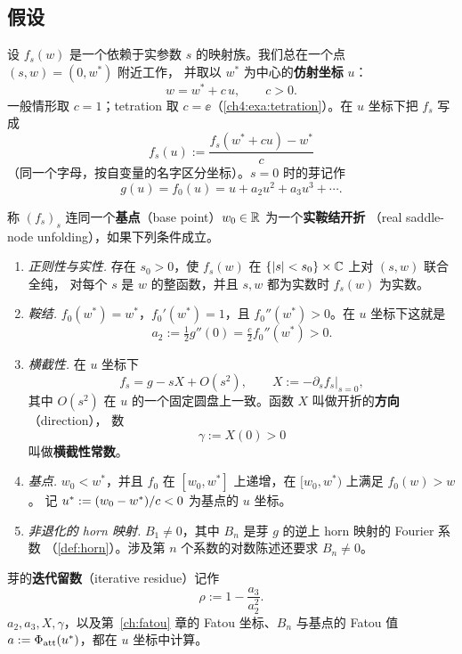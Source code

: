 \subsection{假设}

设 $f_s(w)$ 是一个依赖于实参数 $s$ 的映射族。我们总在一个点 $(s,w)=(0,w^*)$ 附近工作，
并取以 $w^*$ 为中心的\textbf{仿射坐标} $u$：
\begin{equation}\label{ch4:eq:affine}
 w=w^*+c\,u,\qquad c>0 .
\end{equation}
一般情形取 $c=1$；tetration 取 $c=\ee$（\cref{ch4:exa:tetration}）。在 $u$ 坐标下把 $f_s$ 写成
\[
 f_s(u):=\frac{f_s(w^*+cu)-w^*}{c}
\]
（同一个字母，按自变量的名字区分坐标）。$s=0$ 时的芽记作
\[
 g(u)=f_0(u)=u+a_2u^2+a_3u^3+\cdots .
\]

\begin{definition}[实鞍结开折]\label{def:unfolding}
称 $(f_s)_s$ 连同一个\textbf{基点}（base point）$w_0\in\mathbb{R}$ 为一个\textbf{实鞍结开折}
（real saddle-node unfolding），如果下列条件成立。
\begin{enumerate}[label=\textup{(H\arabic*)},leftmargin=3.2em]
\item \emph{正则性与实性.} 存在 $s_0>0$，使 $f_s(w)$ 在 $\{|s|<s_0\}\times\mathbb{C}$ 上对 $(s,w)$ 联合全纯，
  对每个 $s$ 是 $w$ 的整函数，并且 $s,w$ 都为实数时 $f_s(w)$ 为实数。
\item \emph{鞍结.} $f_0(w^*)=w^*$，$f_0'(w^*)=1$，且 $f_0''(w^*)>0$。在 $u$ 坐标下这就是
  \[
   a_2:=\tfrac12g''(0)=\tfrac c2f_0''(w^*)>0 .
  \]
\item \emph{横截性.} 在 $u$ 坐标下
  \begin{equation}\label{ch4:eq:direction}
   f_s=g-sX+O(s^2),\qquad X:=-\partial_sf_s\big|_{s=0},
  \end{equation}
  其中 $O(s^2)$ 在 $u$ 的一个固定圆盘上一致。函数 $X$ 叫做开折的\textbf{方向}（direction），
  数
  \[
   \gamma:=X(0)>0
  \]
  叫做\textbf{横截性常数}。
\item \emph{基点.} $w_0<w^*$，并且 $f_0$ 在 $[w_0,w^*]$ 上递增，在 $[w_0,w^*)$ 上满足 $f_0(w)>w$。
  记 $u^{*}:=(w_0-w^*)/c<0$ 为基点的 $u$ 坐标。
\item \emph{非退化的 horn 映射.} $B_1\ne0$，其中 $B_n$ 是芽 $g$ 的逆上 horn 映射的 Fourier 系数
  （\cref{def:horn}）。涉及第 $n$ 个系数的对数陈述还要求 $B_n\ne0$。
\end{enumerate}
芽的\textbf{迭代留数}（iterative residue）记作
\[
 \rho:=1-\frac{a_3}{a_2^2}.
\]
$a_2,a_3,X,\gamma$，以及第~\ref{ch:fatou} 章的 Fatou 坐标、$B_n$ 与基点的 Fatou 值 $a:=\Phi_{\mathrm{att}}(u^{*})$，都在 $u$ 坐标中计算。
\end{definition}


